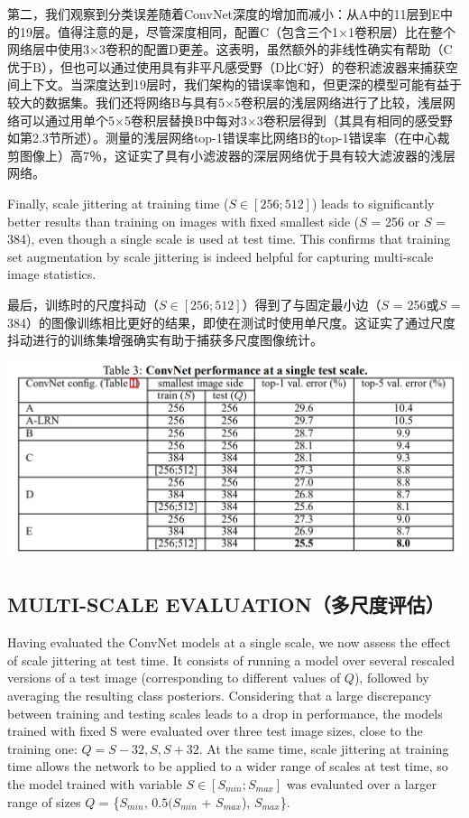 \documentclass[12pt,a4paper,UTF8,twoside]{book}
\begin{document}
第二，我们观察到分类误差随着ConvNet深度的增加而减小：从A中的11层到E中的19层。值得注意的是，尽管深度相同，配置C（包含三个1×1卷积层）比在整个网络层中使用3×3卷积的配置D更差。这表明，虽然额外的非线性确实有帮助（C优于B），但也可以通过使用具有非平凡感受野（D比C好）的卷积滤波器来捕获空间上下文。当深度达到19层时，我们架构的错误率饱和，但更深的模型可能有益于较大的数据集。我们还将网络B与具有5×5卷积层的浅层网络进行了比较，浅层网络可以通过用单个5×5卷积层替换B中每对3×3卷积层得到（其具有相同的感受野如第2.3节所述）。测量的浅层网络top-1错误率比网络B的top-1错误率（在中心裁剪图像上）高7％，这证实了具有小滤波器的深层网络优于具有较大滤波器的浅层网络。

Finally, scale jittering at training time (\(S \in [256; 512]\)) leads to significantly better results than training on images with fixed smallest side (\(S\) = 256 or \(S\) = 384), even though a single scale is used at test time. This confirms that training set augmentation by scale jittering is indeed helpful for capturing multi-scale image statistics.

最后，训练时的尺度抖动（\(S \in [256; 512]\)）得到了与固定最小边（\(S\) = 256或\(S\) = 384）的图像训练相比更好的结果，即使在测试时使用单尺度。这证实了通过尺度抖动进行的训练集增强确实有助于捕获多尺度图像统计。

\begin{center}\includegraphics[width=0.7\linewidth]{img/03-03} \end{center}

\hypertarget{multi-scale-evaluationux591aux5c3aux5ea6ux8bc4ux4f30}{%
\subsection{MULTI-SCALE EVALUATION（多尺度评估）}\label{multi-scale-evaluationux591aux5c3aux5ea6ux8bc4ux4f30}}

Having evaluated the ConvNet models at a single scale, we now assess the effect of scale jittering at test time. It consists of running a model over several rescaled versions of a test image (corresponding to different values of \(Q\)), followed by averaging the resulting class posteriors. Considering that a large discrepancy between training and testing scales leads to a drop in performance, the models trained with fixed S were evaluated over three test image sizes, close to the training one: \(Q = {S − 32, S, S + 32}\). At the same time, scale jittering at training time allows the network to be applied to a wider range of scales at test time, so the model trained with variable \(S \in [S_{min}; S_{max}]\) was evaluated over a larger range of sizes \(Q\) = \{\(S_{min}\), \(0.5(S_{min}\) + \(S_{max}\)), \(S_{max}\)\}.
\end{document}
